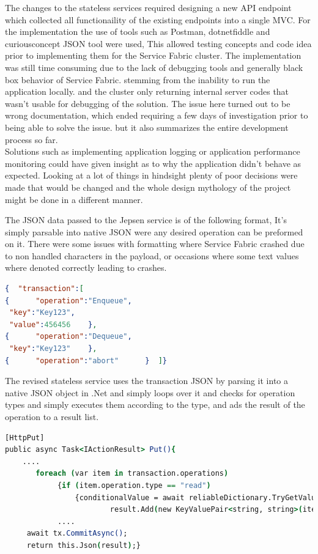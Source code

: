 \documentclass[a4paper,10pt,titlepage]{report}
\begin{document}
The changes to the stateless services required designing a new API endpoint which collected all functionaility of the existing endpoints into a single MVC. For the implementation the use of tools such as Postman, dotnetfiddle and curiousconcept JSON tool were used, This allowed testing concepts and code idea prior to implementing them for the Service Fabric cluster. The implementation was still time consuming due to the lack of debugging tools and generally black box behavior of Service Fabric. stemming from the inability  to run the application locally. and the cluster only returning internal server codes that wasn't usable for debugging of the solution. The issue here turned out to be wrong documentation, which ended requiring a few days of investigation prior to being able to solve the issue. but it also summarizes the entire development process so far.\\

Solutions such as implementing application logging or application performance monitoring could have given insight as to why the application didn't behave as expected. Looking at a lot of things in hindsight plenty of poor decisions were made that would be changed and the whole design mythology of the project might be done in a different manner.

\vspace{5mm}

The JSON data passed to the Jepsen service is of the following format, It's simply parsable into native JSON were any desired operation can be preformed on it. There were some issues with formatting where Service Fabric crashed due to non handled characters in the payload, or occasions where some text values where denoted correctly leading to crashes. \\
\begin{lstlisting}[language=json]
{  "transaction":[
{      "operation":"Enqueue",
 "key":"Key123",
 "value":456456    },
{      "operation":"Dequeue",
 "key":"Key123"    },
{      "operation":"abort"      }  ]}
\end{lstlisting}  

The revised stateless service uses the transaction JSON by parsing it into a native JSON object in .Net and simply loops over it and checks for operation types and simply executes them according to the type, and ads the result of the operation to a result list.
\begin{lstlisting}[language=csh]
[HttpPut]
public async Task<IActionResult> Put(){
    ....
       foreach (var item in transaction.operations)
            {if (item.operation.type == "read")
                {conditionalValue = await reliableDictionary.TryGetValueAsync(tx, item.key.Value);
                        result.Add(new KeyValuePair<string, string>(item.key.Value, value.ToString()));}
            ....
     await tx.CommitAsync();
     return this.Json(result);}
\end{lstlisting}  
\end{document}
